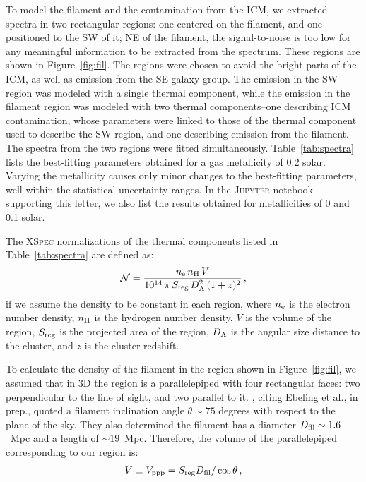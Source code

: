 To model the filament and the contamination from the ICM, we extracted spectra in two rectangular regions: one centered on the filament, and one positioned to the SW of it; NE of the filament, the signal-to-noise is too low for any meaningful information to be extracted from the spectrum. These regions are shown in Figure~\ref{fig:fil}. The regions were chosen to avoid the bright parts of the ICM, as well as emission from the SE galaxy group. The emission in the SW region was modeled with a single thermal component, while the emission in the filament region was modeled with two thermal components--one describing ICM contamination, whose parameters were linked to those of the thermal component used to describe the SW region, and one describing emission from the filament. The spectra from the two regions were fitted simultaneously. Table~\ref{tab:spectra} lists the best-fitting parameters obtained for a gas metallicity of 0.2 solar. Varying the metallicity causes only minor changes to the best-fitting parameters, well within the statistical uncertainty ranges. In the \textsc{Jupyter} notebook supporting this letter, we also list the results obtained for metallicities of 0 and 0.1 solar.

The \textsc{XSpec} normalizations of the thermal components listed in Table~\ref{tab:spectra} are defined as:
\begin{equation}
	\mathcal{N} = \frac{n_{\rm e} \, n_{\rm H} \, V}{10^{14} \, \pi \, S_{\rm reg} \, D_{\rm A}^2 \, (1+z)^2} \, , 
\label{eq:norm}
\end{equation}
if we assume the density to be constant in each region, where $n_{\rm e}$ is the electron number density, $n_{\rm H}$ is the hydrogen number density, $V$ is the volume of the region, $S_{\rm reg}$ is the projected area of the region, $D_{\rm A}$ is the angular size distance to the cluster, and $z$ is the cluster redshift.

To calculate the density of the filament in the region shown in Figure~\ref{fig:fil}, we assumed that in 3D the region is a parallelepiped with four rectangular faces: two perpendicular to the line of sight, and two parallel to it. \citet{Jauzac2012}, citing Ebeling et al., in prep., quoted a filament inclination angle $\theta \sim 75$ degrees with respect to the plane of the sky. They also determined the filament has a diameter $D_{\rm fil} \sim 1.6$~Mpc and a length of $\sim 19$~Mpc. Therefore, the volume of the parallelepiped corresponding to our region is:
\begin{eqnarray}
    V \equiv V_{\rm ppp} = S_{\rm reg} D_{\rm fil} / \cos\theta\, , 
\label{eq:v_ppp}
\end{eqnarray}

